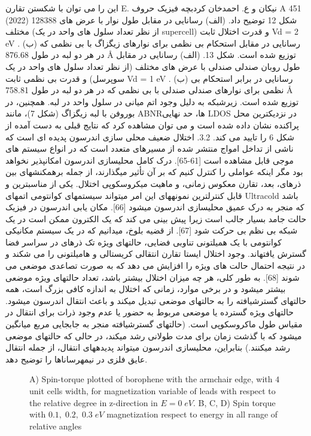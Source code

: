 این را می توان با شکستن تقارن E. نیکان و ع. احمدخان کردبچه فیزیک حروف A 451 (2022) 128388 شکل 12 توضیح داد. (الف) رسانایی در مقابل طول نوار با عرض های مختلف (از نظر تعداد سلول های واحد در یک supercell) و قدرت اختلال ثابت Vd = 2 eV . (ب) رسانایی در مقابل استحکام بی نظمی برای نوارهای زیگزاگ با بی نظمی که در هر دو لبه در طول 876.68 Å توزیع شده است. شکل 13. (الف) رسانایی در مقابل طول روبان صندلی صندلی با عرض های مختلف (از نظر تعداد سلول های واحد در یک سوپرسل) و قدرت بی نظمی ثابت Vd = 1 eV . (ب) رسانایی در برابر استحکام بی نظمی برای نوارهای صندلی صندلی با بی نظمی که در هر دو لبه در طول 758.81 Å توزیع شده است. زیرشبکه به دلیل وجود اتم میانی در سلول واحد در لبه. همچنین، در بوروفن با لبه زیگزاگ (شکل 7)، مانند ABNRها، حد نهایی LDOS در نزدیکترین محل پراکنده نشان داده شده است و می توان مشاهده کرد که نتایج قبلی به دست آمده از شکل 6 را تایید می کند. 3.2. اختلال ضعیف محلی سازی اندرسون پدیده ای است که ناشی از تداخل امواج منتشر شده از مسیرهای متعدد است که در انواع سیستم های موجی قابل مشاهده است [61-65]. درک کامل محلیسازی اندرسون امکانپذیر نخواهد بود مگر اینکه عواملی را کنترل کنیم که بر آن تأثیر میگذارند، از جمله برهمکنشهای بین ذرهای، بعد، تقارن معکوس زمانی، و ماهیت میکروسکوپی اختلال. یکی از مناسبترین و قابل کنترلترین نمونههای این امر میتواند سیستمهای کوانتومی اتمهای Ultracold باشد که منجر به درک عمیق محلیسازی اندرسون میشود [66]. مکان یابی اندرسون در فیزیک حالت جامد بسیار جالب است زیرا پیش بینی می کند که یک الکترون ممکن است در یک شبکه بی نظم بی حرکت شود [67]. از قضیه بلوخ، میدانیم که در یک سیستم مکانیکی کوانتومی با یک همیلتونی تناوبی فضایی، حالتهای ویژه تک ذرهای در سراسر فضا گسترش یافتهاند. وجود اختلال ایستا تقارن انتقالی کریستالی و هامیلتونی را می شکند و در نتیجه احتمال حالت های ویژه را افزایش می دهد که به صورت تصاعدی موضعی می شوند [68]. به طور کلی، هر چه میزان اختلال بیشتر باشد، تعداد حالتهای ویژه موضعی بیشتر میشود و در برخی موارد، زمانی که اختلال به اندازه کافی بزرگ است، همه حالتهای گسترشیافته را به حالتهای موضعی تبدیل میکند و باعث انتقال اندرسون میشود. حالتهای ویژه گسترده یا موضعی مربوط به حضور یا عدم وجود ذرات برای انتقال در مقیاس طول ماکروسکوپی است. (حالتهای گسترشیافته منجر به جابجایی مربع میانگین میشود که با گذشت زمان برای مدت طولانی رشد میکند، در حالی که حالتهای موضعی رشد میکنند.) بنابراین، محلیسازی اندرسون میتواند پدیدههای انتقال، از جمله انتقال عایق فلزی در نیمهرساناها را توضیح دهد.

\begin{figure}[ht]
    \centering
    \resizebox{0.45\textwidth}{!}{}
    \resizebox{0.45\textwidth}{!}{}
    \resizebox{0.45\textwidth}{!}{}
    \resizebox{0.45\textwidth}{!}{}
    \caption{ A) Spin-torque plotted of borophene with the armchair edge, with $4$ unit cells width, for magnetization variable of leads with respect to the relative degree in z-direction in $E = 0\; eV$. B, C, D) Spin torque with $0.1,\;0.2,\;0.3\;eV$ magnetization respect to energy in all range of relative angles}
    \label{fig:stt}
\end{figure}

